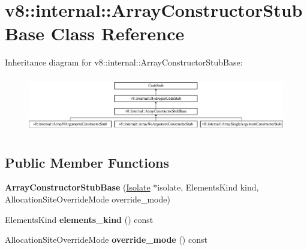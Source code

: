 \hypertarget{classv8_1_1internal_1_1_array_constructor_stub_base}{}\section{v8\+:\+:internal\+:\+:Array\+Constructor\+Stub\+Base Class Reference}
\label{classv8_1_1internal_1_1_array_constructor_stub_base}
Inheritance diagram for v8\+:\+:internal\+:\+:Array\+Constructor\+Stub\+Base\+:\begin{figure}[H]
\begin{center}
\leavevmode
\includegraphics[height=2.480620cm]{classv8_1_1internal_1_1_array_constructor_stub_base}
\end{center}
\end{figure}
\subsection*{Public Member Functions}
\begin{DoxyCompactItemize}
\item 
\hypertarget{classv8_1_1internal_1_1_array_constructor_stub_base_a5f0e0ca83fe21bfce0f2504fd44cedc5}{}{\bfseries Array\+Constructor\+Stub\+Base} (\hyperlink{classv8_1_1internal_1_1_isolate}{Isolate} $\ast$isolate, Elements\+Kind kind, Allocation\+Site\+Override\+Mode override\+\_\+mode)\label{classv8_1_1internal_1_1_array_constructor_stub_base_a5f0e0ca83fe21bfce0f2504fd44cedc5}

\item 
\hypertarget{classv8_1_1internal_1_1_array_constructor_stub_base_ac736069b779982eb6c1e8c6049a419a4}{}Elements\+Kind {\bfseries elements\+\_\+kind} () const \label{classv8_1_1internal_1_1_array_constructor_stub_base_ac736069b779982eb6c1e8c6049a419a4}

\item 
\hypertarget{classv8_1_1internal_1_1_array_constructor_stub_base_a0d4e21d13752ba4a649c4b12c5beb8b3}{}Allocation\+Site\+Override\+Mode {\bfseries override\+\_\+mode} () const \label{classv8_1_1internal_1_1_array_constructor_stub_base_a0d4e21d13752ba4a649c4b12c5beb8b3}

\end{DoxyCompactItemize}
